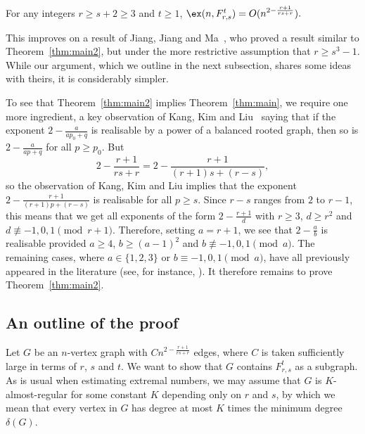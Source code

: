 \begin{theorem} \label{thm:main2}
	For any integers $r\geq s+2\geq 3$ and $t\geq 1$, $\ex(n,F_{r,s}^t)=O(n^{2-\frac{r+1}{rs+r}}).$
\end{theorem}

This improves on a result of Jiang, Jiang and Ma~\cite{JJM20}, who proved a result similar to Theorem~\ref{thm:main2}, but under the more restrictive assumption that $r \geq s^3 - 1$. While our argument, which we outline in the  next subsection, shares some ideas with theirs, it is considerably simpler.

To see that Theorem~\ref{thm:main2} implies Theorem~\ref{thm:main}, we require one more ingredient, a key observation of Kang, Kim and Liu~\cite{KKL18} saying that if the exponent $2 - \frac{a}{a p_0 +q}$ is realisable by a power of a balanced rooted graph, then so is $2 - \frac{a}{ap+q}$ for all $p \geq p_0$. But
\[2 - \frac{r+1}{rs+r} = 2 - \frac{r+1}{(r+1)s +(r- s)},\]
so the observation of Kang, Kim and Liu implies that the exponent $2 - \frac{r+1}{(r+1)p + (r- s)}$ is realisable for  all $p \geq s$. Since $r- s$ ranges from $2$ to $r-1$, this means that we get all exponents of the form $2 - \frac{r+1}{d}$ with $r \geq 3$, $d \geq r^2$ 
and $d \not\equiv -1, 0, 1 \pmod{r+1}$. 
Therefore, setting $a = r+1$, we see that $2 - \frac{a}{b}$ is realisable provided $a \geq 4$, $b \geq (a-1)^2$ and $b \not\equiv -1, 0, 1 \pmod{a}$. 
The remaining cases, where $a \in \{1, 2, 3\}$ or $b \equiv -1, 0, 1 \pmod{a}$, have all previously appeared in the literature (see, for instance,  \cite{KKL18}). 
It therefore remains to prove Theorem~\ref{thm:main2}.
    









\subsection{An outline of the proof}

Let $G$ be an $n$-vertex graph with $Cn^{2-\frac{r+1}{rs+r}}$ edges, where $C$ is taken sufficiently large in terms of $r$, $s$ and $t$. We want to show that $G$ contains $F_{r,s}^t$ as a subgraph. As is usual when estimating extremal numbers, we may assume that $G$ is $K$-almost-regular for some constant $K$ depending only on $r$ and $s$, by which we mean that every vertex in $G$ has degree at most $K$ times the minimum degree $\delta(G)$.

